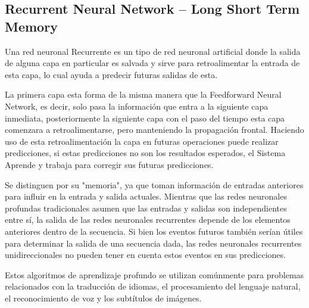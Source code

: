 \documentclass[12pt, a4paper, titlepage]{report}
\begin{document}
				\subsection{Recurrent Neural Network – Long Short Term Memory}
				Una red neuronal \Gls{Recurrente} es un tipo de red neuronal artificial donde la salida de alguna capa en particular es salvada y sirve para retroalimentar la entrada de esta capa, lo cual ayuda a predecir futuras salidas de esta.\par
				La primera capa esta forma de la misma manera que la Feedforward Neural Network, es decir, solo pasa la información que entra a la siguiente capa inmediata, posteriormente la siguiente capa con el paso del tiempo esta capa comenzara a retroalimentarse, pero manteniendo la propagación frontal. Haciendo uso de esta retroalimentación la capa en futuras operaciones puede realizar predicciones, si estas predicciones no son los resultados esperados, el \Gls{Sistema} \Gls{Aprende} y trabaja para corregir sus futuras predicciones.\cite{refTiposRedesNeu1}\par
				Se distinguen por su "memoria", ya que toman información de entradas anteriores para influir en la entrada y salida actuales. Mientras que las redes neuronales profundas tradicionales asumen que las entradas y salidas son independientes entre sí, la salida de las redes neuronales recurrentes depende de los elementos anteriores dentro de la secuencia. Si bien los eventos futuros también serían útiles para determinar la salida de una secuencia dada, las redes neuronales recurrentes unidireccionales no pueden tener en cuenta estos eventos en sus predicciones.\cite{refTiposRedesNeu4}\par
				Estos algoritmos de aprendizaje profundo se utilizan comúnmente para problemas relacionados con la traducción de idiomas, el procesamiento del lenguaje natural, el reconocimiento de voz y los subtítulos de imágenes.
				\newpage
\end{document}
